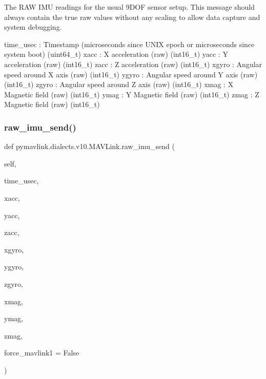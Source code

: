 \begin{DoxyVerb}
\begin{DoxyVerb}
\begin{DoxyVerb}
\begin{DoxyVerb}
\begin{DoxyVerb}The RAW IMU readings for the usual 9DOF sensor setup. This message
should always contain the true raw values without any
scaling to allow data capture and system debugging.

time_usec                 : Timestamp (microseconds since UNIX epoch or microseconds since system boot) (uint64_t)
xacc                      : X acceleration (raw) (int16_t)
yacc                      : Y acceleration (raw) (int16_t)
zacc                      : Z acceleration (raw) (int16_t)
xgyro                     : Angular speed around X axis (raw) (int16_t)
ygyro                     : Angular speed around Y axis (raw) (int16_t)
zgyro                     : Angular speed around Z axis (raw) (int16_t)
xmag                      : X Magnetic field (raw) (int16_t)
ymag                      : Y Magnetic field (raw) (int16_t)
zmag                      : Z Magnetic field (raw) (int16_t)\end{DoxyVerb}
 \mbox{\label{classpymavlink_1_1dialects_1_1v10_1_1MAVLink_acc709eee31435a187302d5d9a47b6cb3}} 
\subsubsection{\texorpdfstring{raw\+\_\+imu\+\_\+send()}{raw\_imu\_send()}}
{\footnotesize\ttfamily def pymavlink.\+dialects.\+v10.\+M\+A\+V\+Link.\+raw\+\_\+imu\+\_\+send (\begin{DoxyParamCaption}\item[{}]{self,  }\item[{}]{time\+\_\+usec,  }\item[{}]{xacc,  }\item[{}]{yacc,  }\item[{}]{zacc,  }\item[{}]{xgyro,  }\item[{}]{ygyro,  }\item[{}]{zgyro,  }\item[{}]{xmag,  }\item[{}]{ymag,  }\item[{}]{zmag,  }\item[{}]{force\+\_\+mavlink1 = {\ttfamily False} }\end{DoxyParamCaption})}


\end{DoxyVerb}
\end{DoxyVerb}
\end{DoxyVerb}
\end{DoxyVerb}
